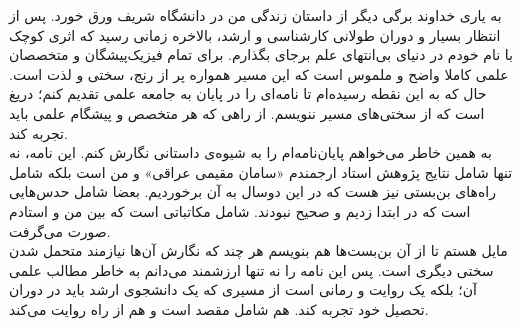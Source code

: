 \setcounter{chapter}{-1}
به یاری خداوند برگی دیگر از داستان زندگی من در دانشگاه شریف ورق خورد. پس از انتظار بسیار و دوران طولانی کارشناسی و ارشد، بالاخره زمانی رسید که اثری کوچک با نام خودم در دنیای بی‌انتهای علم برجای بگذارم. برای تمام فیزیک‌پیشگان و متخصصان علمی کاملا واضح و ملموس است که این مسیر همواره پر از رنج، سختی و لذت است. حال که به این نقطه رسیده‌ام تا نامه‌ای را در پایان به جامعه علمی تقدیم کنم؛ دریغ است که از سختی‌های مسیر ننویسم. از راهی که هر متخصص و پیشگام علمی باید تجربه کند.\\

به همین خاطر می‌خواهم پایان‌نامه‌ام را به شیوه‌ی داستانی نگارش کنم. این نامه، نه تنها شامل نتایج پژوهش استاد ارجمندم «سامان مقیمی عراقی»  و من است بلکه شامل راه‌های بن‌بستی نیز هست که در این دوسال به آن برخوردیم. بعضا شامل حدس‌هایی است که در ابتدا زدیم و صحیح نبودند. شامل مکاتباتی است که بین من و استادم صورت می‌گرفت.\\

مایل هستم تا از آن بن‌بست‌ها هم بنویسم هر چند که نگارش آن‌ها نیازمند متحمل شدن سختی دیگری است. پس این نامه را نه تنها ارزشمند می‌دانم به خاطر مطالب علمی آن؛ بلکه یک روایت و رمانی است از مسیری که یک دانشجوی ارشد باید در دوران تحصیل خود تجربه کند. هم شامل مقصد است و هم از راه روایت می‌کند.